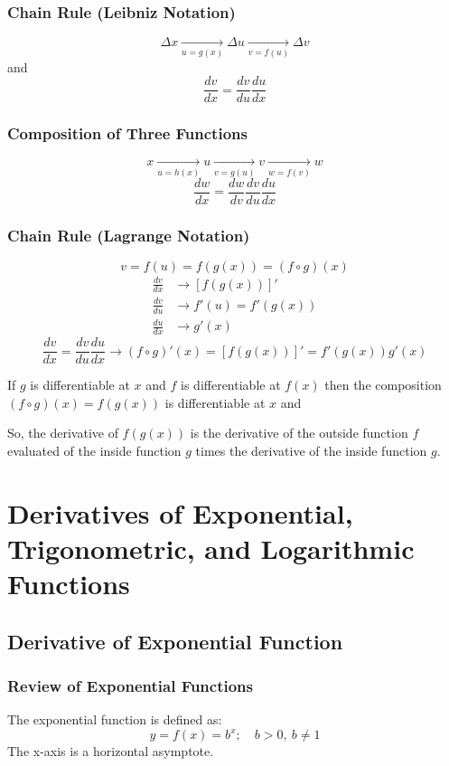 		\subsection{Chain Rule (Leibniz Notation)}
			\[\Delta x \underset{u=g(x)}{\longrightarrow} \Delta u \underset{v=f(u)}{\longrightarrow} \Delta v\]
			and
			\[\frac{dv}{dx} = \frac{dv}{du}\frac{du}{dx}\]
		\subsection{Composition of Three Functions}
			\[x \underset{u=h(x)}{\longrightarrow} u \underset{v=g(u)}{\longrightarrow} v \underset{w=f(v)}{\longrightarrow} w\]
			\[\frac{dw}{dx} = \frac{dw}{dv} \frac{dv}{du} \frac{du}{dx}\]
		\subsection{Chain Rule (Lagrange Notation)}
			\[v = f(u) = f(g(x)) = (f \circ g)(x)\]
			\begin{align*}
				\frac{dv}{dx} &\rightarrow [f(g(x))]'\\
				\frac{dv}{du} &\rightarrow f'(u) = f'(g(x))\\
				\frac{du}{dx} &\rightarrow g'(x)
			\end{align*}
			\[\frac{dv}{dx} = \frac{dv}{du} \frac{du}{dx} \rightarrow (f \circ g)'(x) = [f(g(x))]' = f'(g(x))g'(x)\]

			If $g$ is differentiable at $x$ and $f$ is differentiable at $f(x)$ then the composition $(f \circ g)(x) = f(g(x))$ is differentiable at $x$ and

			So, the derivative of $f(g(x))$ is the derivative of the outside function $f$ evaluated of the inside function $g$ times the derivative of the inside function $g$.
\setcounter{chapter}{4}
\chapter{Derivatives of Exponential, Trigonometric, and Logarithmic Functions}
	\section{Derivative of Exponential Function}
		\subsection{Review of Exponential Functions}
			The exponential function is defined as:
			\[y=f(x)=b^x; \quad b > 0,\ b \neq 1\]
			The x-axis is a horizontal asymptote.
